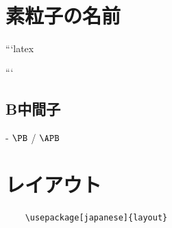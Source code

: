 \documentclass[
    article,
    head_space=25truemm,
    foot_space=10truemm,
    gutter=15truemm]{jlreq}
\begin{document}
\section{素粒子の名前}

\begin{markdown}
```latex
\usepackage[italic]{hepnames}
```
\end{markdown}

\subsection{B中間子}

\begin{markdown}
- $\PB$ / $\APB$
\end{markdown}

\section{レイアウト}

\begin{verbatim}
    \usepackage[japanese]{layout}
\end{verbatim}

\centering
\layout

\printbibliography[title={参考文献}]
\end{document}

